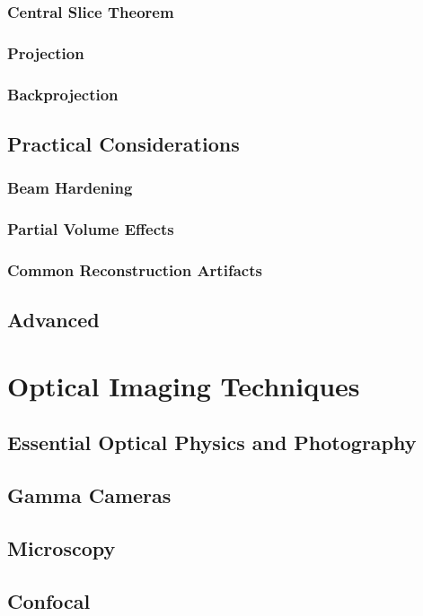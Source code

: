\documentclass{book}
\begin{document}
				\section{Central Slice Theorem}
				\section{Projection}
				\section{Backprojection}
			\chapter{Practical Considerations}
				\section{Beam Hardening}
				\section{Partial Volume Effects}
				\section{Common Reconstruction Artifacts}
			\chapter{Advanced }
			
		
		
		\part{Optical Imaging Techniques}
			\chapter{Essential Optical Physics and Photography}
			\chapter{Gamma Cameras}
			\chapter{Microscopy}
			\chapter{Confocal}
\end{document}
